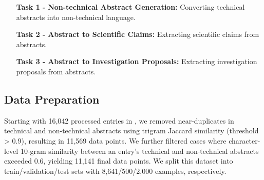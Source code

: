 \documentclass[11pt]{article}
\begin{document}
\begin{itemize}[noitemsep, wide, labelwidth=!, labelindent=0pt]
\item [\textbf{Task 1 -}] \textbf{Non-technical Abstract Generation:} Converting technical abstracts into non-technical language.
\item [\textbf{Task 2 -}]\textbf{Abstract to Scientific Claims:} Extracting scientific claims from abstracts.
\item [\textbf{Task 3 -}]\textbf{Abstract to Investigation Proposals:} Extracting investigation proposals from abstracts.
\end{itemize}

\subsection{Data Preparation}

Starting with 16,042 processed entries in \DatasetNameMatSci, we removed near-duplicates in technical and non-technical abstracts using trigram Jaccard similarity (threshold > 0.9), resulting in 11,569 data points. We further filtered cases where character-level 10-gram similarity between an entry's technical and non-technical abstracts exceeded 0.6, yielding 11,141 final data points. We split this dataset into train/validation/test sets with 8,641/500/2,000 examples, respectively.
\end{document}
